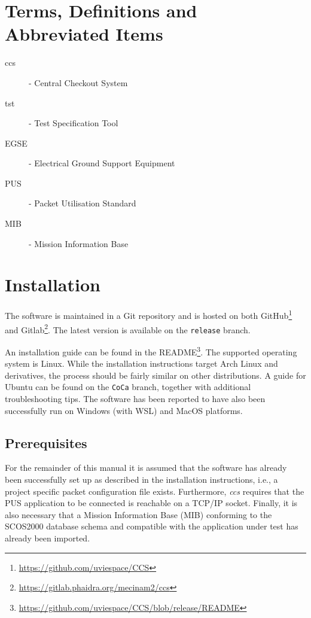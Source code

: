 \chapter{Terms, Definitions and Abbreviated Items}
\begin{description}
\item [ccs] - Central Checkout System
\item [tst] - Test Specification Tool
\item [EGSE] - Electrical Ground Support Equipment
\item [PUS] - Packet Utilisation Standard
\item [MIB] - Mission Information Base
\end{description}

\chapter{Installation}

The software is maintained in a Git repository and is hosted on both GitHub\footnote{\href{https://github.com/uviespace/CCS}{\url{https://github.com/uviespace/CCS}}}
and Gitlab\footnote{\href{https://gitlab.phaidra.org/mecinam2/ccs}{\url{https://gitlab.phaidra.org/mecinam2/ccs}}}. The latest version is available on the \texttt{release} branch.

An installation guide can be found in the README\footnote{\href{https://github.com/uviespace/CCS/blob/release/README}{\url{https://github.com/uviespace/CCS/blob/release/README}}}.
The supported operating system is Linux. While the installation instructions target Arch Linux and derivatives, the process should be fairly similar on other distributions. A guide for Ubuntu
can be found on the \texttt{CoCa} branch, together with additional troubleshooting tips. The software has been reported to have also been successfully run on Windows (with WSL) and MacOS platforms.

\section{Prerequisites}
For the remainder of this manual it is assumed that the software has already been successfully set up as described in the installation instructions, i.e., a project specific packet
configuration file exists. Furthermore, \textit{ccs} requires that the PUS application to be connected is reachable on a TCP/IP socket.
Finally, it is also necessary that a Mission Information Base (MIB) conforming to the SCOS2000 database schema and compatible with the application under test has already been imported.


